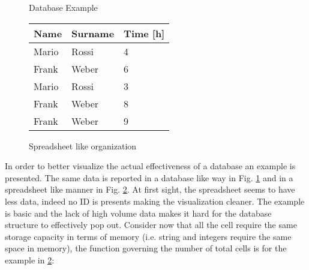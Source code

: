 \documentclass[../main.tex]{subfiles}
\begin{document}
\begin{figure}[H]
    \centering
{}
    \caption{Database Example}
    \label{fig:dbexample}
\end{figure}
\begin{figure}[H]
\begin{center}
\begin{tabular}{ | m{2.5cm} | m{2.5cm}| m{2.5cm} | } 
\hline
\textbf{Name} & \textbf{Surname} & \textbf{Time [h]} \\ 
\hline
Mario & Rossi & 4 \\
\hline
Frank & Weber & 6 \\
\hline
Mario & Rossi & 3 \\
\hline
Frank & Weber & 8 \\
\hline
Frank & Weber & 9 \\
\hline
\end{tabular}
\end{center}
    \caption{Spreadsheet like organization}
    \label{fig:spreadsheet}
\end{figure}
In order to better visualize the actual effectiveness of a database an example is presented. The same data is reported in a database like way in Fig. \ref{fig:dbexample} and in a spreadsheet like manner in Fig. \ref{fig:spreadsheet}. At first sight, the spreadsheet seems to have less data, indeed no ID is presents making the visualization cleaner. The example is basic and the lack of high volume data makes it hard for the database structure to effectively pop out. Consider now that all the cell require the same storage capacity in terms of memory (i.e. string and integers require the same space in memory), the function governing the number of total cells is for the example in \ref{fig:spreadsheet}:
\end{document}
